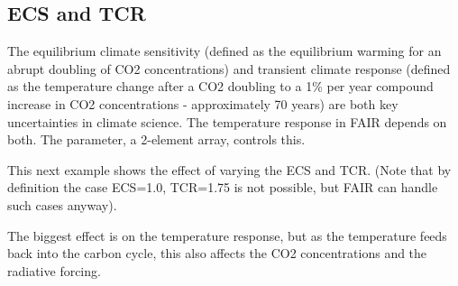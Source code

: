 \documentclass[letterpaper,10pt,english]{sphinxmanual}
\begin{document}
\noindent{}


\subsection{ECS and TCR}
\label{\detokenize{examples:ecs-and-tcr}}
The equilibrium climate sensitivity (defined as the equilibrium warming
for an abrupt doubling of CO2 concentrations) and transient climate
response (defined as the temperature change after a CO2 doubling to a 1\%
per year compound increase in CO2 concentrations - approximately 70
years) are both key uncertainties in climate science. The temperature
response in FAIR depends on both. The  parameter, a 2-element
array, controls this.

This next example shows the effect of varying the ECS and TCR. (Note
that by definition the case ECS=1.0, TCR=1.75 is not possible, but FAIR
can handle such cases anyway).

The biggest effect is on the temperature response, but as the
temperature feeds back into the carbon cycle, this also affects the CO2
concentrations and the radiative forcing.
\end{document}
